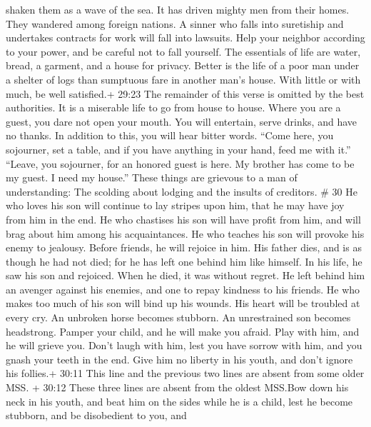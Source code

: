 shaken them as a wave of the sea. It has driven mighty men from their
homes. They wandered among foreign nations.  A sinner who
falls into suretiship and undertakes contracts for work will fall into
lawsuits.  Help your neighbor according to your power, and
be careful not to fall yourself.  The essentials of life
are water, bread, a garment, and a house for privacy. 
Better is the life of a poor man under a shelter of logs than sumptuous
fare in another man's house.  With little or with much, be
well satisfied.+ 29:23 The remainder of this verse is omitted by the
best authorities.  It is a miserable life to go from house
to house. Where you are a guest, you dare not open your mouth.
 You will entertain, serve drinks, and have no thanks. In
addition to this, you will hear bitter words.  ``Come here,
you sojourner, set a table, and if you have anything in your hand, feed
me with it.''  ``Leave, you sojourner, for an honored guest
is here. My brother has come to be my guest. I need my house.''
 These things are grievous to a man of understanding: The
scolding about lodging and the insults of creditors. \# 30 
He who loves his son will continue to lay stripes upon him, that he may
have joy from him in the end.  He who chastises his son will
have profit from him, and will brag about him among his acquaintances.
 He who teaches his son will provoke his enemy to jealousy.
Before friends, he will rejoice in him.  His father dies,
and is as though he had not died; for he has left one behind him like
himself.  In his life, he saw his son and rejoiced. When he
died, it was without regret.  He left behind him an avenger
against his enemies, and one to repay kindness to his friends.
 He who makes too much of his son will bind up his wounds.
His heart will be troubled at every cry.  An unbroken horse
becomes stubborn. An unrestrained son becomes headstrong. 
Pamper your child, and he will make you afraid. Play with him, and he
will grieve you.  Don't laugh with him, lest you have
sorrow with him, and you gnash your teeth in the end.  Give
him no liberty in his youth, and don't ignore his follies.+ 30:11 This
line and the previous two lines are absent from some older MSS.
 + 30:12 These three lines are absent from the oldest
MSS.Bow down his neck in his youth, and beat him on the sides while he
is a child, lest he become stubborn, and be disobedient to you, and
